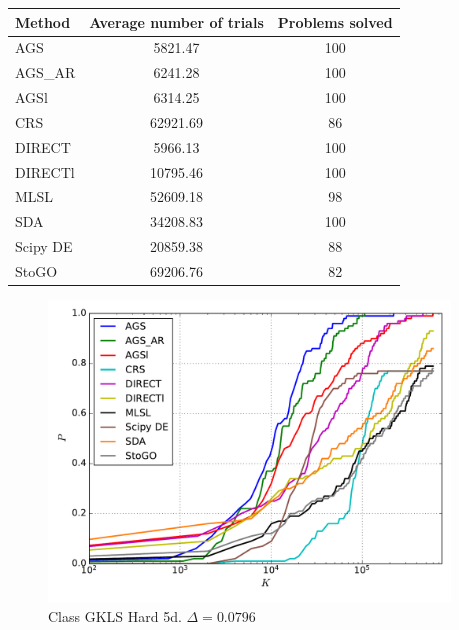 \documentclass[a4paper]{article}
\begin{document}
\begin{tabular}{lcc}
\hline
 Method   &  Average number of trials  &  Problems solved  \\
\hline
 AGS      &          5821.47           &        100        \\
 AGS\_AR   &          6241.28           &        100        \\
 AGSl     &          6314.25           &        100        \\
 CRS      &          62921.69          &        86         \\
 DIRECT   &          5966.13           &        100        \\
 DIRECTl  &          10795.46          &        100        \\
 MLSL     &          52609.18          &        98         \\
 SDA      &          34208.83          &        100        \\
 Scipy DE &          20859.38          &        88         \\
 StoGO    &          69206.76          &        82         \\
\hline
\end{tabular}
\begin{figure}[H]
  \center
  \includegraphics[width=0.95\textwidth]{../experiments/gklsh5d_serg/cmc.pdf}
  \caption{Class GKLS Hard 5d. $\Delta=0.0796$}

\end{figure}
\end{document}
